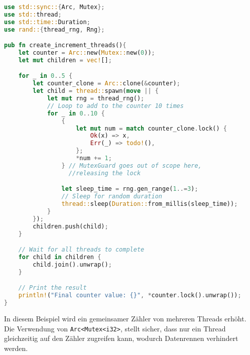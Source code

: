\begin{lstlisting}[language=Rust, caption=Sicheres Erstellen von Threads ]
use std::sync::{Arc, Mutex};
use std::thread;
use std::time::Duration;
use rand::{thread_rng, Rng}; 

pub fn create_increment_threads(){
    let counter = Arc::new(Mutex::new(0));
    let mut children = vec![];

    for _ in 0..5 {
        let counter_clone = Arc::clone(&counter);
        let child = thread::spawn(move || {
            let mut rng = thread_rng(); 
            // Loop to add to the counter 10 times
            for _ in 0..10 { 
                {
                    let mut num = match counter_clone.lock() {
                        Ok(x) => x,
                        Err(_) => todo!(),
                    };
                    *num += 1;
                } // MutexGuard goes out of scope here, 
                  //releasing the lock

                let sleep_time = rng.gen_range(1..=3); 
                // Sleep for random duration
                thread::sleep(Duration::from_millis(sleep_time)); 
            }
        });
        children.push(child);
    }

    // Wait for all threads to complete
    for child in children {
        child.join().unwrap();
    }

    // Print the result
    println!("Final counter value: {}", *counter.lock().unwrap());
}
\end{lstlisting}
\noindent
In diesem Beispiel wird ein gemeinsamer Zähler von mehreren Threads erhöht. 
Die Verwendung von \texttt{Arc<Mutex<i32>}, stellt sicher, dass nur ein Thread gleichzeitig auf den Zähler zugreifen kann, wodurch Datenrennen verhindert werden.
